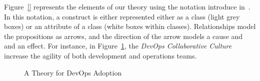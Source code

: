 Figure~\ref{} represents the elements of our theory using the
notation introduce in~\cite{sjoberg2008}. In this notation,
a construct is either represented either as a class (light grey
boxes) or an attribute of a class (white boxes within classes).
Relationships model the propositions as arrows, and the direction
of the arrow models a cause and and an effect. For instance,
in Figure~\ref{fig:theory}, the \emph{DevOps Collaborative Culture}
increase the agility of both development and operations teams.


\begin{figure}[htb]
  \caption{A Theory for DevOps Adoption}
  \label{fig:theory} 
\end{figure}



